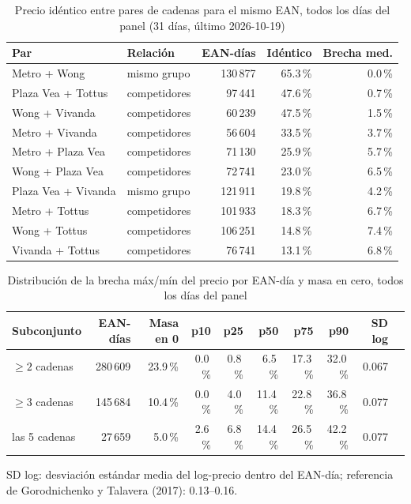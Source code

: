 
\begin{table}[htbp]
\caption{Precio id\'entico entre pares de cadenas para el mismo EAN, todos los d\'ias del panel (31 d\'ias, \'ultimo 2026-10-19)}
\label{tab:identidad}
\centering\scriptsize\setlength{\tabcolsep}{3pt}
\begin{tabular}{@{}llrrr@{}}
\toprule
Par & Relaci\'on & EAN-d\'ias & Id\'entico & Brecha med. \\
\midrule
Metro + Wong & mismo grupo & 130\,877 & 65.3\,\% & 0.0\,\% \\
Plaza Vea + Tottus & competidores & 97\,441 & 47.6\,\% & 0.7\,\% \\
Wong + Vivanda & competidores & 60\,239 & 47.5\,\% & 1.5\,\% \\
Metro + Vivanda & competidores & 56\,604 & 33.5\,\% & 3.7\,\% \\
Metro + Plaza Vea & competidores & 71\,130 & 25.9\,\% & 5.7\,\% \\
Wong + Plaza Vea & competidores & 72\,741 & 23.0\,\% & 6.5\,\% \\
Plaza Vea + Vivanda & mismo grupo & 121\,911 & 19.8\,\% & 4.2\,\% \\
Metro + Tottus & competidores & 101\,933 & 18.3\,\% & 6.7\,\% \\
Wong + Tottus & competidores & 106\,251 & 14.8\,\% & 7.4\,\% \\
Vivanda + Tottus & competidores & 76\,741 & 13.1\,\% & 6.8\,\% \\
\bottomrule\end{tabular}\end{table}

\begin{table}[t]
\caption{Distribuci\'on de la brecha m\'ax/m\'in del precio por EAN-d\'ia y masa en cero, todos los d\'ias del panel}
\label{tab:brecha}
\centering\scriptsize\setlength{\tabcolsep}{4pt}
\begin{tabular}{@{}lrrrrrrrrr@{}}
\toprule
Subconjunto & EAN-d\'ias & Masa en 0 & p10 & p25 & p50 & p75 & p90 & SD log \\
\midrule
$\geq 2$ cadenas & 280\,609 & 23.9\,\% & 0.0\,\% & 0.8\,\% & 6.5\,\% & 17.3\,\% & 32.0\,\% & 0.067 \\
$\geq 3$ cadenas & 145\,684 & 10.4\,\% & 0.0\,\% & 4.0\,\% & 11.4\,\% & 22.8\,\% & 36.8\,\% & 0.077 \\
las 5 cadenas & 27\,659 & 5.0\,\% & 2.6\,\% & 6.8\,\% & 14.4\,\% & 26.5\,\% & 42.2\,\% & 0.077 \\
\bottomrule\end{tabular}
\par\smallskip\raggedright\scriptsize SD log: desviaci\'on est\'andar media del log-precio dentro del EAN-d\'ia; referencia de Gorodnichenko y Talavera (2017): 0.13--0.16.
\end{table}

